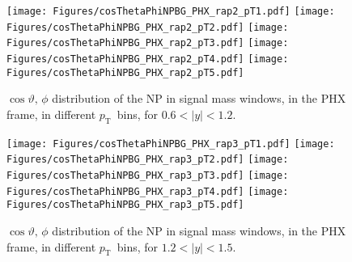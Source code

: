 \documentclass[12pt]{article}
\newcommand{\pt}{$p_{\mathrm{T}}$}
\begin{document}
\begin{figure}[htbp]
\centering
\texttt{[image: Figures/cosThetaPhiNPBG\_PHX\_rap2\_pT1.pdf]}
\texttt{[image: Figures/cosThetaPhiNPBG\_PHX\_rap2\_pT2.pdf]}
\texttt{[image: Figures/cosThetaPhiNPBG\_PHX\_rap2\_pT3.pdf]}
\texttt{[image: Figures/cosThetaPhiNPBG\_PHX\_rap2\_pT4.pdf]}
\texttt{[image: Figures/cosThetaPhiNPBG\_PHX\_rap2\_pT5.pdf]}
\caption{$\cos\vartheta,\,\phi$ distribution of the NP in signal mass windows, 
	in the PHX frame, in different \pt\ bins, for $0.6 < |y| < 1.2$.}
\end{figure}
\clearpage

\begin{figure}[htbp]
\centering
\texttt{[image: Figures/cosThetaPhiNPBG\_PHX\_rap3\_pT1.pdf]}
\texttt{[image: Figures/cosThetaPhiNPBG\_PHX\_rap3\_pT2.pdf]}
\texttt{[image: Figures/cosThetaPhiNPBG\_PHX\_rap3\_pT3.pdf]}
\texttt{[image: Figures/cosThetaPhiNPBG\_PHX\_rap3\_pT4.pdf]}
\texttt{[image: Figures/cosThetaPhiNPBG\_PHX\_rap3\_pT5.pdf]}
\caption{$\cos\vartheta,\,\phi$ distribution of the NP in signal mass windows, 
	in the PHX frame, in different \pt\ bins, for $1.2 < |y| < 1.5$.}
\end{figure}
\clearpage
\end{document}
